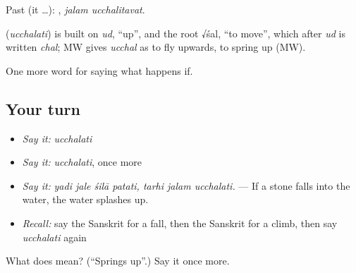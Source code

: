 Past (it …):  , \emph{jalam ucchalitavat}.

\begin{cousinweb}
\textbf{} (\emph{ucchalati}) is built on \emph{ud}, \textquotedblleft{}up\textquotedblright{}, and the root √śal, \textquotedblleft{}to move\textquotedblright{}, which after \emph{ud} is written \emph{chal}; MW gives \emph{ucchal} as to fly upwards, to spring up (MW).
\end{cousinweb}

\begin{grammarlens}[title={What you've built}]
One more word for saying what happens if.
\end{grammarlens}

\subsection*{Your turn}
\begin{itemize}
\raggedright
  \item \emph{Say it:} \emph{ucchalati}
  \item \emph{Say it:} \emph{ucchalati}, once more
  \item \emph{Say it:} \emph{yadi jale śilā patati, tarhi jalam ucchalati.} — If a stone falls into the water, the water splashes up.
  \item \emph{Recall:} say the Sanskrit for a fall, then the Sanskrit for a climb, then say \emph{ucchalati} again
\end{itemize}

\begin{tcolorbox}[breakable,colback=teal!4,colframe=teal!35!black,title={Before you move on}]
What does  mean? (\textquotedblleft{}Springs up\textquotedblright{}.) Say it once more.
\end{tcolorbox}
